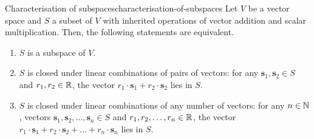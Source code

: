 \begin{lemma}{Characterisation of subspaces}{characterisation-of-subspaces}
 Let $V$ be a vector space and $S$ a subset of $V$ with inherited operations of
 vector addition and scalar multiplication. Then, the following statements are
 equivalent.
 \begin{enumerate}[label=(\alph*)]
  \item $S$ is a subspace of $V$.
  \item $S$ is closed under linear combinations of pairs of vectors: for any
   $\mathbf{s}_1,\mathbf{s}_2 \in S$ and $r_1,r_2 \in \mathbb{R}$, the vector $r_1 \cdot
   \mathbf{s}_1 + r_2 \cdot \mathbf{s}_2$ lies in $S$.
  \item $S$ is closed under linear combinations of any number of vectors: for
   any $n \in \mathbb{N}$, vectors $\mathbf{s}_1,\mathbf{s}_2,\ldots,\mathbf{s}_n \in S$
   and $r_1,r_2,\ldots,r_n \in \mathbb{R}$, the vector $r_1 \cdot \mathbf{s}_1 + r_2
   \cdot \mathbf{s}_2 + \ldots + r_n \cdot \mathbf{s}_n$ lies in $S$.
 \end{enumerate}
\end{lemma}
